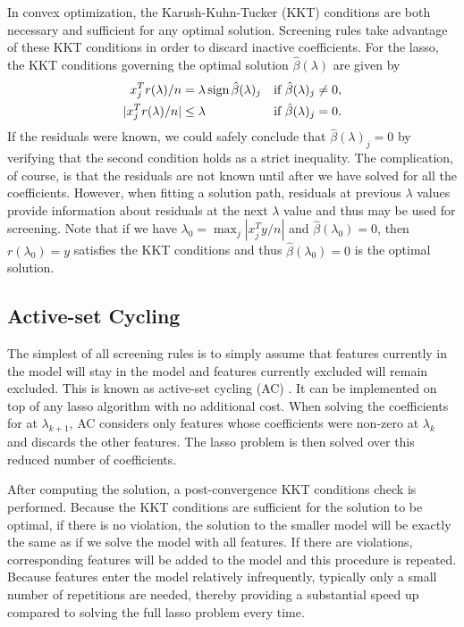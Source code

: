 In convex optimization, the Karush-Kuhn-Tucker (KKT) conditions are both necessary and sufficient for any optimal solution.  Screening rules take advantage of these KKT conditions in order to discard inactive coefficients.  For the lasso, the KKT conditions governing the optimal solution $\hat{\beta}(\lambda)$ are given by
\begin{equation}
  \begin{aligned}
    x_j^Tr(\lambda)/n &= \lambda \, \textrm{sign} \, \hat{\beta}(\lambda)_j & & \textrm{if } \hat{\beta}(\lambda)_j\neq 0,\\
    |x_j^Tr(\lambda)/n| &\leq \lambda & & \textrm{if } \hat{\beta}(\lambda)_j= 0.
  \end{aligned}
\end{equation}
If the residuals were known, we could safely conclude that $\hat{\beta}(\lambda)_j=0$ by verifying that the second condition holds as a strict inequality.  The complication, of course, is that the residuals are not known until after we have solved for all the coefficients.  However, when fitting a solution path, residuals at previous $\lambda$ values provide information about residuals at the next $\lambda$ value and thus may be used for screening. Note that if we have $\lambda_0=\max_j|x_j^Ty/n|$ and $\hat{\beta}(\lambda_0)=0$, then $r(\lambda_0)=y$ satisfies the KKT conditions and thus $\hat{\beta}(\lambda_0)=0$ is the optimal solution.

\subsection{Active-set Cycling}
\label{sec:active}

The simplest of all screening rules is to simply assume that features currently in the model will stay in the model and features currently excluded will remain excluded.  This is known as active-set cycling (AC) \citep{lee2007efficient}. It can be implemented on top of any lasso algorithm with no additional cost. When solving the coefficients for at $\lambda_{k+1}$, AC considers only features whose coefficients were non-zero at $\lambda_k$ and discards the other features. The lasso problem is then solved over this reduced number of coefficients.

After computing the solution, a post-convergence KKT conditions check is performed. Because the KKT conditions are sufficient for the solution to be optimal, if there is no violation, the solution to the smaller model will be exactly the same as if we solve the model with all features. If there are violations, corresponding features will be added to the model and this procedure is repeated. Because features enter the model relatively infrequently, typically only a small number of repetitions are needed, thereby providing a substantial speed up compared to solving the full lasso problem every time.

